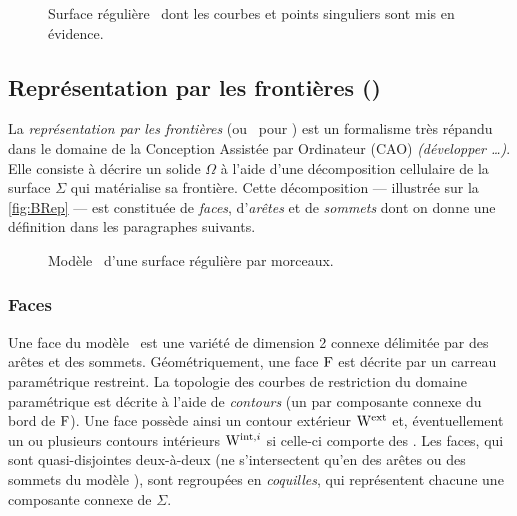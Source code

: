 \begin{figure}
	\centering
	
	\caption{Surface régulière \piecewise\ dont les courbes et points singuliers sont mis en évidence.}
	\label{fig:piecewise_smooth_surface_decomposition}
\end{figure}


\subsection{Représentation par les frontières (\brep)}
La \textit{représentation par les frontières} (ou \brep\ pour ) est un formalisme très répandu dans le domaine de la Conception Assistée par Ordinateur (CAO) \textit{(développer \ldots)}.
Elle consiste à décrire un solide $\Omega$ à l'aide d'une décomposition cellulaire de la surface $\Sigma$ qui matérialise sa frontière. 
Cette décomposition --- illustrée sur la \autoref{fig:BRep} --- est constituée de \textit{faces}, d'\textit{arêtes} et de \textit{sommets} dont on donne une définition dans les paragraphes suivants. 

\begin{figure}
	\centering
	
	\caption{Modèle \brep\ d'une surface régulière par morceaux.}
	\label{fig:BRep}
\end{figure}

\subsubsection{Faces}
\label{section:def_brep_faces}
Une face du modèle \brep\ est une variété de dimension 2 connexe délimitée par des arêtes et des sommets. 
Géométriquement, une face $\mathrm{F}$ est décrite par un carreau paramétrique restreint.
La topologie des courbes de restriction du domaine paramétrique est décrite à l'aide de \textit{contours} (un par composante connexe du bord de $\mathrm{F}$). 
Une face possède ainsi un contour extérieur $\mathrm{W}^{\mathrm{ext}}$ et, éventuellement un ou plusieurs contours intérieurs $\mathrm{W}^{\mathrm{int},i}$ si celle-ci comporte des .
Les faces, qui sont quasi-disjointes deux-à-deux (\ie ne s'intersectent qu'en des arêtes ou des sommets du modèle \brep), sont regroupées en \textit{coquilles}, qui représentent chacune une composante connexe de $\Sigma$. 


